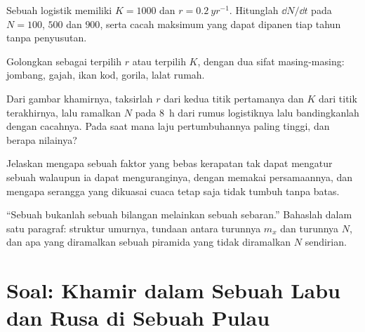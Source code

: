 \begin{exercise}[$\star\star$]\label{exo:b1:populations:8}
Sebuah  logistik memiliki $K = 1000$ dan $r = \qty{0.2}{yr^{-1}}$.
Hitunglah $\dd N/\dd t$ pada $N = 100$, $500$ dan $900$, serta cacah
maksimum yang dapat dipanen tiap tahun tanpa penyusutan.
\end{exercise}

\begin{exercise}[$\star\star$]\label{exo:b1:populations:9}
Golongkan sebagai terpilih $r$ atau terpilih $K$, dengan dua sifat
masing-masing: jombang, gajah, ikan kod, gorila, lalat rumah.
\end{exercise}

\begin{exercise}[$\star\star\star$]\label{exo:b1:populations:10}
Dari gambar khamirnya, taksirlah $r$ dari kedua titik pertamanya dan
$K$ dari titik terakhirnya, lalu ramalkan $N$ pada \qty{8}{h} dari
rumus logistiknya lalu bandingkanlah dengan cacahnya. Pada saat mana
laju pertumbuhannya paling tinggi, dan berapa nilainya?
\end{exercise}

\begin{exercise}[$\star\star\star$]\label{exo:b1:populations:11}
Jelaskan mengapa sebuah faktor yang bebas kerapatan tak dapat mengatur
sebuah  walaupun ia dapat menguranginya, dengan memakai
persamaannya, dan mengapa  serangga yang dikuasai cuaca tetap
saja tidak tumbuh tanpa batas.
\end{exercise}

\begin{exercise}[$\star\star\star$]\label{exo:b1:populations:12}
``Sebuah  bukanlah sebuah bilangan melainkan sebuah sebaran.''
Bahaslah dalam satu paragraf: struktur umurnya, tundaan antara turunnya
$m_x$ dan turunnya $N$, dan apa yang diramalkan sebuah piramida yang
tidak diramalkan $N$ sendirian.
\end{exercise}

\section{Soal: Khamir dalam Sebuah Labu dan Rusa di Sebuah Pulau}

